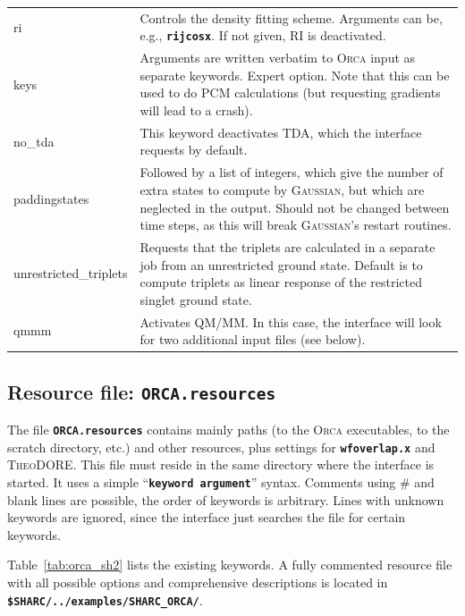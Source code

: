 \documentclass[a4paper,10pt,DIV=15,openany]{scrbook}
\newcommand{\ttt}[1]{\textbf{\texttt{#1}}}
\begin{document}
\begin{table}
\begin{tabular}{>{\ttfamily}lp{12cm}}
\\
ri                      &Controls the density fitting scheme. Arguments can be, e.g., \ttt{rijcosx}. If not given, RI is deactivated.
\\
keys                    &Arguments are written verbatim to \textsc{Orca} input as separate keywords. Expert option. Note that this can be used to do PCM calculations (but requesting gradients will lead to a crash).
\\
no\_tda                 &This keyword deactivates TDA, which the interface requests by default.
\\
paddingstates           &Followed by a list of integers, which give the number of extra states to compute by \textsc{Gaussian}, but which are neglected in the output. Should not be changed between time steps, as this will break \textsc{Gaussian}'s restart routines.
\\
unrestricted\_triplets  &Requests that the triplets are calculated in a separate job from an unrestricted ground state. Default is to compute triplets as linear response of the restricted singlet ground state.
\\
qmmm                    &Activates QM/MM. In this case, the interface will look for two additional input files (see below).\\
  \hline
  \end{tabular}
\end{table}

\subsection{Resource file: \ttt{ORCA.resources}}

The file \ttt{ORCA.resources} contains mainly paths (to the \textsc{Orca} executables, to the scratch directory, etc.) and other resources, plus settings for \ttt{wfoverlap.x} and \textsc{TheoDORE}. This file must reside in the same directory where the interface is started. It uses a simple ``\ttt{keyword argument}'' syntax. Comments using \# and blank lines are possible, the order of keywords is arbitrary. Lines with unknown keywords are ignored, since the interface just searches the file for certain keywords.

Table~\ref{tab:orca_sh2} lists the existing keywords.
A fully commented resource file with all possible options and comprehensive descriptions is located in \ttt{\$SHARC/../examples/SHARC\_ORCA/}.
\end{document}
